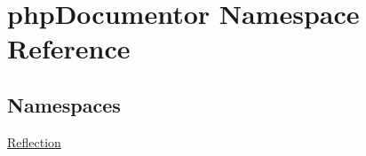 \hypertarget{namespacephp_documentor}{}\section{php\+Documentor Namespace Reference}
\label{namespacephp_documentor}
\subsection*{Namespaces}
\begin{DoxyCompactItemize}
\item 
 \mbox{\hyperlink{namespacephp_documentor_1_1_reflection}{Reflection}}
\end{DoxyCompactItemize}
